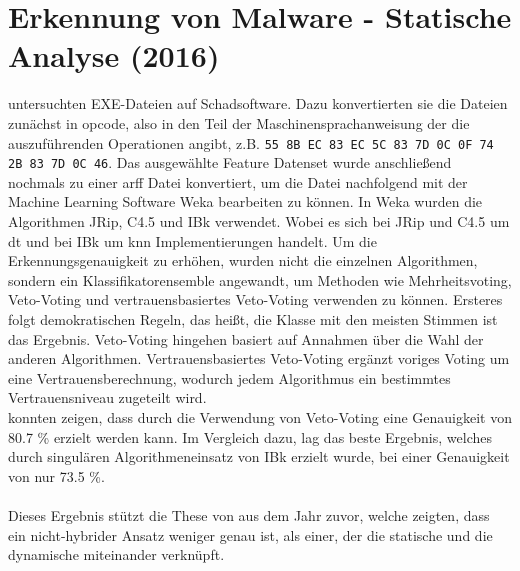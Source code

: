 \documentclass[
    12pt, %
    DIV10,
    ngerman, %
    a4paper, %
    oneside, %
    titlepage, %
    parskip=half, %
    headings=normal, %
    listof=totoc, %
    bibliography=totoc, %
    index=totoc, %
    captions=tableheading, %
    final %
]{scrreprt}
\begin{document}
%
\section{Erkennung von Malware - Statische Analyse (2016)}
\citeauthor{More2016} untersuchten EXE-Dateien auf Schadsoftware. Dazu konvertierten sie die Dateien zunächst in \ac{opcode}, also in den Teil der Maschinensprachanweisung der die auszuführenden Operationen angibt, z.B. \texttt{55 8B EC 83 EC 5C 83 7D 0C 0F 74 2B 83 7D 0C 46}. Das ausgewählte Feature Datenset wurde anschließend nochmals zu einer \ac{arff} Datei konvertiert, um die Datei nachfolgend mit der Machine Learning Software Weka bearbeiten zu können. 
In Weka wurden die Algorithmen JRip, C4.5 und IBk verwendet. Wobei es sich bei JRip und C4.5 um \ac{dt} und bei IBk um \ac{knn} Implementierungen handelt. Um die Erkennungsgenauigkeit zu erhöhen, wurden nicht die einzelnen Algorithmen, sondern ein Klassifikatorensemble angewandt, um Methoden wie Mehrheitsvoting, Veto-Voting und vertrauensbasiertes Veto-Voting verwenden zu können. Ersteres folgt demokratischen Regeln, das heißt, die Klasse mit den meisten Stimmen ist das Ergebnis. Veto-Voting hingehen basiert auf Annahmen über die Wahl der anderen Algorithmen. Vertrauensbasiertes Veto-Voting ergänzt voriges Voting um eine Vertrauensberechnung, wodurch jedem Algorithmus ein bestimmtes Vertrauensniveau zugeteilt wird. \\
\citeauthor{More2016} konnten zeigen, dass durch die Verwendung von Veto-Voting eine Genauigkeit von 80.7 \% erzielt werden kann. Im Vergleich dazu, lag das beste Ergebnis, welches durch singulären Algorithmeneinsatz von IBk erzielt wurde, bei einer Genauigkeit von nur 73.5 \%.\\\\
Dieses Ergebnis stützt die These von \citeauthor{Shijo2015} aus dem Jahr zuvor, welche zeigten, dass ein nicht-hybrider Ansatz weniger genau ist, als einer, der die statische und die dynamische miteinander verknüpft.
\end{document}
